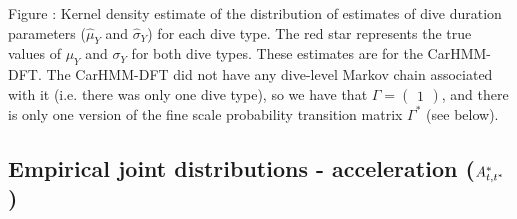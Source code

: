 \documentclass{article}
\begin{document}
        \noindent Figure : Kernel density estimate of the distribution of estimates of dive duration parameters ($\hat \mu_Y$ and $\hat \sigma_Y$) for each dive type. The red star represents the true values of $\mu_Y$ and $\sigma_Y$ for both dive types. These estimates are for the CarHMM-DFT. The CarHMM-DFT did not have any dive-level Markov chain associated with it (i.e. there was only one dive type), so we have that $\Gamma = \begin{pmatrix} 1 \end{pmatrix}$, and there is only one version of the fine scale probability transition matrix $\Gamma^*$ (see below).
    
    \newpage
    \subsection{Empirical joint distributions - acceleration ($A^*_{t,t^*}$)}
\end{document}
